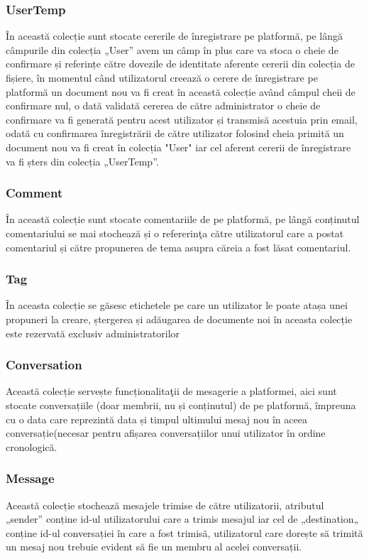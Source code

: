 \documentclass[12pt,a4paper,hidelinks]{report}
\theoremstyle{definition}
\theoremstyle{remark}
\begin{document}
\subsubsection{UserTemp}
În această colecție sunt stocate cererile de înregistrare pe platformă, pe lângă câmpurile din colecția „User” avem un câmp în plus care va stoca o cheie de confirmare și referințe către dovezile de identitate aferente cererii din colecția de fișiere, în momentul când utilizatorul creează o cerere de înregistrare pe platformă un document nou va fi creat în această colecție având câmpul cheii de confirmare nul, o dată validată cererea de către administrator o cheie de confirmare va fi generată pentru acest utilizator și transmisă acestuia prin email, odată cu confirmarea înregistrării de către utilizator folosind cheia primită un document nou va fi creat în colecția "User" iar cel aferent cererii de înregistrare va fi șters din colecția „UserTemp”.
\subsubsection{Comment}
În această colecție sunt stocate comentariile de pe platformă, pe lângă conținutul comentariului se mai stochează și o refererin\c ta către utilizatorul care a postat comentariul și către propunerea de tema asupra căreia a fost lăsat comentariul.
\subsubsection{Tag}
În aceasta colecție se găsesc etichetele pe care un utilizator le poate atașa unei propuneri la creare, ștergerea și adăugarea de documente noi în aceasta colecție este rezervată exclusiv administratorilor
\subsubsection{Conversation}
Această colecție servește funcționalita\c tii de mesagerie a platformei, aici sunt stocate conversațiile (doar membrii, nu și conținutul) de pe platformă, împreuna cu o data care reprezintă data și timpul ultimului mesaj nou în aceea conversație(necesar pentru afișarea conversațiilor unui utilizator în ordine cronologică.
\subsubsection{Message}
Această colecție stochează mesajele trimise de către utilizatorii, atributul „sender” conține id-ul utilizatorului care a trimis mesajul iar cel de „destination„ conține id-ul conversației în care a fost trimisă, utilizatorul   care dorește să trimită un mesaj nou trebuie evident să fie un membru al acelei conversații.
\end{document}

